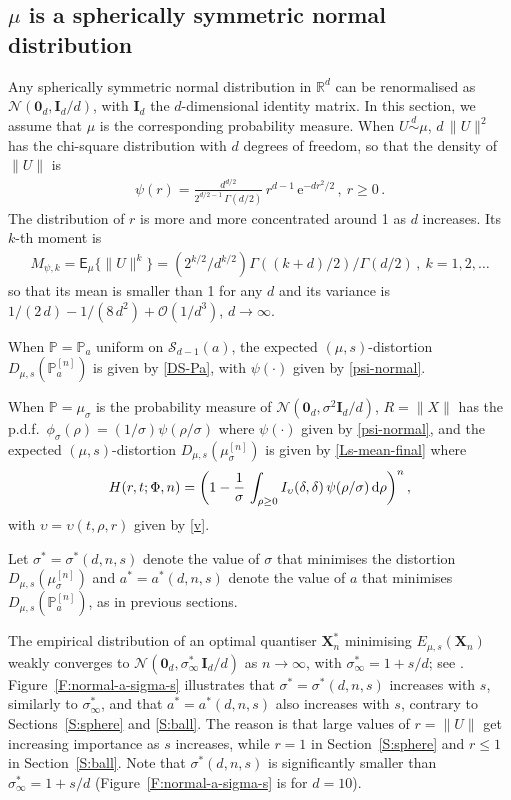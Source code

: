 \documentclass{article}
\def\RR{\mathds{R}}
\def\Ib{\mathbf{I}}
\def\Xb{\mathbf{X}}
\def\Ex{\mathsf{E}}
\def\simd{\stackrel{d}{\sim}}
\def\ms{\sigma}
\newcommand{\vsp} {\vspace{0.3cm}}
\def\PP{\mathbb{P}}
\def\SS{{\mathcal S}}
\def\0b{\mathbf{0}}
\newcommand{\bea}{\begin{eqnarray*}}
\newcommand{\eea}{\end{eqnarray*}}
\newcommand{\be}{\begin{eqnarray}}
\newcommand{\ee}{\end{eqnarray}}
\def\dd{\mbox{\rm d}}
\def\SN{{\mathcal N}}
\def\e1{\mathrm{e}}
\def\SO{{\mathcal O}}
\begin{document}
\subsection{$\mu$ is a spherically symmetric normal distribution}\label{S:normal}

Any spherically symmetric normal distribution in $\RR^d$ can be renormalised as $\SN(\0b_d,\Ib_d/d)$, with $\Ib_d$ the $d$-dimensional identity matrix. In this section, we assume that $\mu$ is the corresponding probability measure. When $U\simd\mu$, $d\,\|U\|^2$ has the chi-square distribution with $d$ degrees of freedom, so that the density of $\|U\|$ is
\be\label{psi-normal}
\psi(r)=\frac{d^{d/2}}{2^{d/2-1}\,\Gamma(d/2)}\,r^{d-1}\,\e1^{-d r^2/2} \,, \ r \geq 0\,.
\ee
The distribution of $r$ is more and more concentrated around 1 as $d$ increases. Its $k$-th moment is
\bea
M_{\psi,k} = \Ex_\mu\{\|U\|^k\}=(2^{k/2}/d^{k/2}) \Gamma((k+d)/2)/\Gamma(d/2)\,, \ k=1,2,\ldots
\eea
so that its mean is smaller than 1 for any $d$ and its variance is $1/(2\,d)-1/(8\, d^2)+ \SO(1/d^3)$, $d\to\infty$.

When $\PP=\PP_a$ uniform on $\SS_{d-1}(a)$, the expected $(\mu,s)$-distortion $D_{\mu,s}(\PP_a^{[n]})$ is given by \eqref{DS-Pa},
with $\psi(\cdot)$ given by \eqref{psi-normal}.

\vsp
When $\PP=\mu_\ms$ is the probability measure of $\SN(\0b_d,\ms^2\Ib_d/d)$, $R=\|X\|$ has the p.d.f.\ $\phi_\ms(\rho)=(1/\ms)\psi(\rho/\ms)$ where $\psi(\cdot)$ given by \eqref{psi-normal}, and the expected $(\mu,s)$-distortion $D_{\mu,s}(\mu^{[n]}_\ms)$ is given by \eqref{Ls-mean-final}
where
\bea
H(r,t;\Phi,n) =\bigg(1-\frac{1}{\ms}\,\int_{\rho\geq 0} I_\upsilon(\delta,\delta) \,\psi(\rho/\ms)\,\dd\rho \bigg)^n \,,
\eea
with $\upsilon=\upsilon(t,\rho,r)$ given by \eqref{v}.

\vsp
Let $\ms^* = \ms^*(d,n,s)$ denote the value of $\ms$ that minimises the distortion $D_{\mu,s}(\mu^{[n]}_\ms)$ and $a^* = a^*(d,n,s)$ denote the value of $a$ that minimises $D_{\mu,s}(\PP_a^{[n]})$, as in previous sections.

The empirical distribution of an optimal quantiser $\Xb_n^*$ minimising $E_{\mu,s}(\Xb_n)$ weakly converges to $\SN(\0b_d,\ms_\infty^*\,\Ib_d/d)$ as $n\to\infty$, with $\ms_\infty^*=1+s/d$; see \cite[Table~7.1]{GrafL2000}. Figure~\ref{F:normal-a-sigma-s} illustrates that $\ms^*=\ms^*(d,n,s)$ increases with $s$, similarly to $\ms_\infty^*$, and that $a^*=a^*(d,n,s)$ also increases with $s$, contrary to Sections~\ref{S:sphere} and \ref{S:ball}. The reason is that large values of $r=\|U\|$ get increasing importance as $s$ increases, while $r=1$ in Section~\ref{S:sphere} and $r\leq 1$ in Section~\ref{S:ball}. Note that $\ms^*(d,n,s)$ is significantly smaller than $\ms_\infty^*=1+s/d$ (Figure~\ref{F:normal-a-sigma-s} is for $d=10$).
\end{document}
